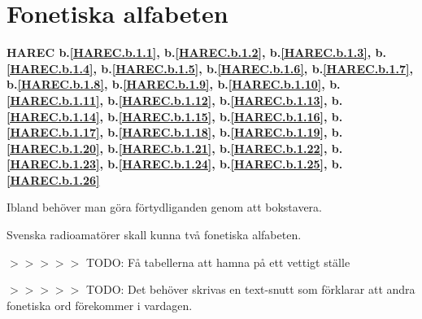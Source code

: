 \section{Fonetiska alfabeten}
\textbf{
HAREC b.\ref{HAREC.b.1.1}\label{myHAREC.b.1.1},
 b.\ref{HAREC.b.1.2}\label{myHAREC.b.1.2},
 b.\ref{HAREC.b.1.3}\label{myHAREC.b.1.3},
 b.\ref{HAREC.b.1.4}\label{myHAREC.b.1.4},
 b.\ref{HAREC.b.1.5}\label{myHAREC.b.1.5},
 b.\ref{HAREC.b.1.6}\label{myHAREC.b.1.6},
 b.\ref{HAREC.b.1.7}\label{myHAREC.b.1.7},
 b.\ref{HAREC.b.1.8}\label{myHAREC.b.1.8},
 b.\ref{HAREC.b.1.9}\label{myHAREC.b.1.9},
 b.\ref{HAREC.b.1.10}\label{myHAREC.b.1.10},
 b.\ref{HAREC.b.1.11}\label{myHAREC.b.1.11},
 b.\ref{HAREC.b.1.12}\label{myHAREC.b.1.12},
 b.\ref{HAREC.b.1.13}\label{myHAREC.b.1.13},
 b.\ref{HAREC.b.1.14}\label{myHAREC.b.1.14},
 b.\ref{HAREC.b.1.15}\label{myHAREC.b.1.15},
 b.\ref{HAREC.b.1.16}\label{myHAREC.b.1.16},
 b.\ref{HAREC.b.1.17}\label{myHAREC.b.1.17},
 b.\ref{HAREC.b.1.18}\label{myHAREC.b.1.18},
 b.\ref{HAREC.b.1.19}\label{myHAREC.b.1.19},
 b.\ref{HAREC.b.1.20}\label{myHAREC.b.1.20},
 b.\ref{HAREC.b.1.21}\label{myHAREC.b.1.21},
 b.\ref{HAREC.b.1.22}\label{myHAREC.b.1.22},
 b.\ref{HAREC.b.1.23}\label{myHAREC.b.1.23},
 b.\ref{HAREC.b.1.24}\label{myHAREC.b.1.24},
 b.\ref{HAREC.b.1.25}\label{myHAREC.b.1.25},
 b.\ref{HAREC.b.1.26}\label{myHAREC.b.1.26}
}

Ibland behöver man göra förtydliganden genom att bokstavera.

Svenska radioamatörer skall kunna två fonetiska alfabeten.

$>>>>>$ TODO: Få tabellerna att hamna på ett vettigt ställe

$>>>>>$ TODO: Det behöver skrivas en text-snutt som förklarar att andra
fonetiska ord förekommer i vardagen.

